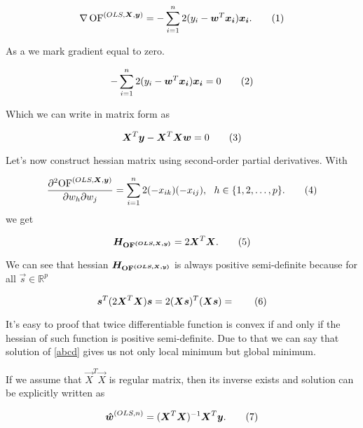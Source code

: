 \begin{equation}
    \nabla \of^{(OLS,\vec{X}, \vec{y})} = -\sum\limits_{i=1}^n 2(y_i - \vec{w}^T\vec{x_i})\vec{x_i}. \numberthis
\end{equation}

As a  we mark gradient equal to zero.

\begin{equation}
    -\sum\limits_{i=1}^n 2(y_i - \vec{w}^T\vec{x_i})\vec{x_i} = 0 \numberthis
\end{equation}

Which we can write in matrix form as 

\begin{equation}
    \vec{X}^T\vec{y} - \vec{X}^T\vec{X}\vec{w} = 0 \numberthis  \label{abcd}
\end{equation}


Let's now construct hessian matrix using second-order partial derivatives. With

\begin{equation}
    \frac{\partial^2{\of^{(OLS,\vec{X}, \vec{y})}} }{\partial w_h\partial w_j} = \sum\limits_{i=1}^n 2(- x_{ik})(-x_{ij}) \\, \ \ h \in \{{1,2,\ldots,p\}}. \numberthis
\end{equation}
we get 

\begin{equation}
    \vec{H_{\of^{(OLS,\vec{X}, \vec{y})}}} = 2\vec{X}^T\vec{X}. \numberthis 
\end{equation}

We can see that hessian $\boldsymbol{H_{\operatorname{OF}^{(OLS,\boldsymbol{X}, \boldsymbol{y})}}}$ is always positive semi-definite because for all $\vec{s} \in \mathbb{R}^p$


\begin{equation}
    \vec{s}^T(2\vec{X}^T\vec{X})\vec{s} = 2(\vec{X}\vec{s})^T(\vec{X}\vec{s}) =  \numberthis
\end{equation}

It's easy to proof that twice differentiable function is convex if and only if the hessian of such function is positive semi-definite. Due to that we can say that solution of \eqref{abcd} gives us not only local minimum but global minimum. 

If we assume that $\vec{X}^T\vec{X}$ is regular matrix, then its inverse exists and solution can be explicitly written as


\begin{equation}
    \vec{\hat{w}}^{(OLS,n)} = (\vec{X}^T\vec{X})^{-1}\vec{X}^T\vec{y}. \numberthis \label{wols}
\end{equation}

